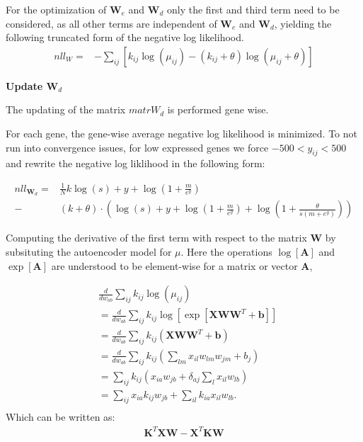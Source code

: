 \documentclass[11pt]{letter}
\newcommand{\matr}[1]{\mathbf{#1}}
\begin{document}
For the optimization of $\matr{W}_e$ and $\matr{W}_d$ only the first and third term need to be considered, as all other terms are independent of $\matr{W}_e$ and $\matr{W}_d$, yielding the following truncated form of the negative log likelihood.
\begin{align*}
nll_W=& -\sum_{ij} \left[ k_{ij} \log{(\mu_{ij})} -
 (k_{ij} + \theta) \log{(\mu_{ij} + \theta)} \right]
\end{align*}



\textbf{Update $\matr{W}_d$}

The updating of the matrix $matr{W}_d$ is performed gene wise.

For each gene, the gene-wise average negative log likelihood is minimized. 
To not run into convergence issues, for low expressed genes we force $-500 < y_{ij} < 500$ and rewrite the negative log liklihood in the following form:

\begin{align*}
nll_{\matr{W}_d}=&  
\frac{1}{N} k \log(s) + y + \log(1 + \frac{m}{e^y}) \\
-& (k + \theta) \cdot \left( \log(s) + y + \log(1 + \frac{m}{e^y}) + \log(1 + \frac{\theta}{s(m + e^y)}) \right)
\end{align*}


Computing the derivative of the first term with respect to the matrix $\matr{W}$ by subsituting the autoencoder model for $\mu$. 
Here the operations $\log[\matr{A}]$ and $\exp[\matr{A}]$ are understood to be element-wise for a matrix or vector $\matr{A}$,

\begin{align*}
&\frac{d}{dw_{ab}}\sum_{ij} k_{ij} \log{(\mu_{ij})} \\
&= \frac{d}{dw_{ab}}\sum_{ij} k_{ij} \log{[\exp{[\matr{X} \matr{W} \matr{W}^T + \matr{b}]}]} \\
&= \frac{d}{dw_{ab}}\sum_{ij} k_{ij} \left (\matr{X} \matr{W} \matr{W}^T + \matr{b} \right ) \\
&= \frac{d}{dw_{ab}}\sum_{ij} k_{ij} \left (\sum_{lm} x_{il} w_{lm} w_{jm} + b_j \right ) \\
&= \sum_{ij} k_{ij} \left (x_{ia} w_{jb} + \delta_{aj} \sum_{l} x_{il}w_{lb} \right ) \\
&= \sum_{ij} x_{ia} k_{ij} w_{jb} + \sum_{il} k_{ia} x_{il} w_{lb}. \\
\end{align*}
Which can be written as:
\begin{align*}
\matr{K}^T \matr{X} \matr{W} - \matr{X}^T \matr{K} \matr{W}
\end{align*}
\end{document}
